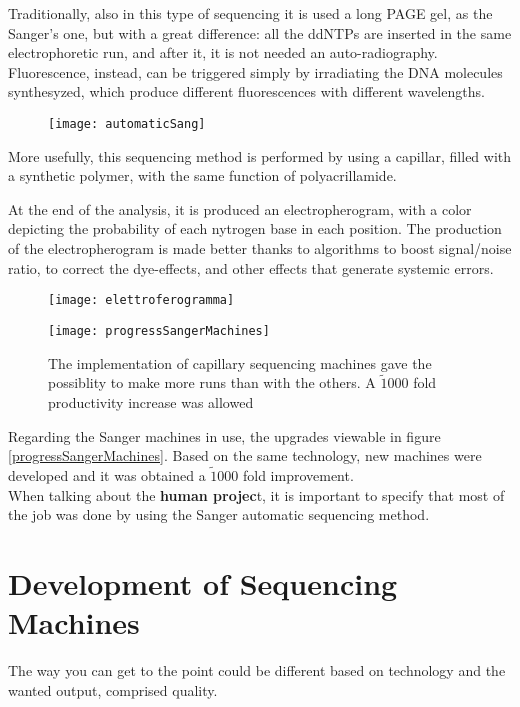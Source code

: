 Traditionally, also in this type of sequencing it is used a long PAGE gel, as the Sanger's one, but with a great difference: all the ddNTPs are inserted in the same electrophoretic run, and after it, it is not needed an auto-radiography. Fluorescence, instead, can be triggered simply by irradiating the DNA molecules synthesyzed, which produce different fluorescences with different wavelengths.

\begin{figure}[h]
\caption{}
\centering
\texttt{[image: automaticSang]}
\label{}
\end{figure}


More usefully, this sequencing method is performed by using a capillar, filled with a synthetic polymer, with the same function of polyacrillamide.

At the end of the analysis, it is produced an electropherogram, with a color depicting the probability of each nytrogen base in each position. The production of the electropherogram is made better thanks to algorithms to boost signal/noise ratio, to correct the dye-effects, and other effects that generate systemic errors. %

\begin{figure}[h]
\caption{}
\centering
\texttt{[image: elettroferogramma]}
\label{}
\end{figure}

\begin{figure}[h]
\caption{The implementation of capillary sequencing machines gave the possiblity to make more runs than with the others. A $\tilde 1000$ fold productivity increase was allowed}
\centering
\texttt{[image: progressSangerMachines]}
\label{}
\end{figure}

Regarding the Sanger machines in use, the upgrades viewable in figure \ref{progressSangerMachines}. Based on the same technology, new machines were developed and it was obtained a $\tilde 1000$ fold improvement.
\\
When talking about the \textbf{human projec}t, it is important to specify that most of the job was done by using the Sanger automatic sequencing method.


\section{Development of Sequencing Machines}
The way you can get to the point could be different based on technology and the wanted output, comprised quality.

